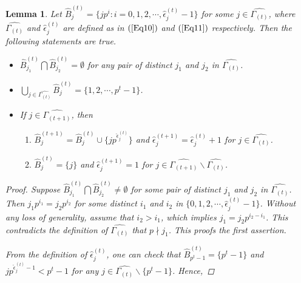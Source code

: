 \documentclass[pdflatex,sn-mathphys-num]{sn-jnl}%
\newtheorem{lemma}{Lemma}
\theoremstyle{thmstyleone}%
\theoremstyle{thmstyletwo}%
\theoremstyle{thmstylethree}%
\begin{document}
     \begin{lemma}\label{L10}
         Let $\hat{B}_{j}^{(t)}=\{jp^{i}:i=0,1,2,\cdots,\hat{\epsilon}_{j}^{(t)}-1\}$ for some $j\in\widehat{\Gamma_{(t)}}$, where $\widehat{\Gamma_{(t)}}$ and $\hat{\epsilon}_{j}^{(t)}$ are defined as in $(\ref{Eq10})$ and $(\ref{Eq11})$ respectively. Then the following statements are true.
         \begin{itemize}
             \item $\hat{B}_{j_{1}}^{(t)}\bigcap \hat{B}_{j_{2}}^{(t)}=\emptyset$ for any pair of distinct $j_{1}$ and $j_{2}$ in $\widehat{\Gamma_{(t)}}$.
             \item $\bigcup_{j\in\widehat{\Gamma_{(t)}}}\hat{B}_{j}^{(t)}=\{1,2,\cdots,p^t-1\}$.
             \item If $j\in\widehat{\Gamma_{(t+1)}}$, then 
             \begin{enumerate}
                 \item[] $\hat{B}_{j}^{(t+1)}=\hat{B}_{j}^{(t)}\cup\{jp^{\hat{\epsilon}_{j}^{(t)}}\}$ and $\hat{\epsilon}_{j}^{(t+1)}=\hat{\epsilon}_{j}^{(t)}+1$ for $j\in\widehat{\Gamma_{(t)}}$. 
                 \item[] $\hat{B}_{j}^{(t)}=\{j\}$ and $\hat{\epsilon}_{j}^{(t+1)}=1$ for $j\in\widehat{\Gamma_{(t+1)}}\backslash\widehat{\Gamma_{(t)}}$.
             \end{enumerate}
         \end{itemize}
         \begin{proof}
             Suppose $\hat{B}_{j_{1}}^{(t)}\bigcap \hat{B}_{j_{2}}^{(t)}\neq\emptyset$ for some pair of distinct $j_{1}$ and $j_{2}$ in $\widehat{\Gamma_{(t)}}$. Then $j_{1}p^{i_{1}}=j_{2}p^{i_{2}}$ for some distinct $i_{1}$ and $i_{2}$ in 
            $\{0,1,2,\cdots,\hat{\epsilon}_{j}^{(t)}-1\}$. Without any loss of generality, assume that $i_{2}>i_{1}$, which implies $j_{1}=j_{2}p^{i_{2}-i_{1}}$. This contradicts the definition of $\widehat{\Gamma_{(t)}}$ that $p\nmid j_{1}$. This proofs the first assertion.
            \par From the definition of $\hat{\epsilon}_{j}^{(t)}$, one can check that $\hat{B}_{p^t-1}^{(t)}=\{p^t-1\}$ and $jp^{\hat{\epsilon}_{j}^{(t)}-1}<p^t-1$ for any $j\in\widehat{\Gamma_{(t)}}\backslash\{p^t-1\}$. Hence, 

\end{proof}
\end{lemma}
\end{document}
